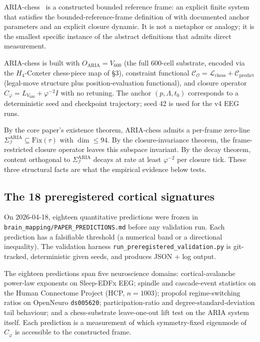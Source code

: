 \documentclass[11pt]{article}
\theoremstyle{plain}
\theoremstyle{definition}
\theoremstyle{remark}
\newcommand{\Fix}{\mathrm{Fix}}
\newcommand{\Ical}{\mathcal{I}}
\newcommand{\Ocal}{\mathcal{O}}
\newcommand{\Ccal}{\mathcal{C}}
\newcommand{\Cph}{C_\varphi}
\begin{document}
ARIA-chess~\citep{SmartAriaChess2026} is a constructed bounded reference frame: an explicit finite system that satisfies the bounded-reference-frame definition of \citet{SmartExistenceClosure} with documented anchor parameters and an explicit closure dynamic. It is not a metaphor or analogy; it is the smallest specific instance of the abstract definitions that admits direct measurement.

ARIA-chess is built with $O_{\mathrm{ARIA}} = V_{600}$ (the full 600-cell substrate, encoded via the $H_4$-Coxeter chess-piece map of \citet{SmartAriaChess2026} \S 3), constraint functional $\Ccal_\Ocal = \mathcal{L}_{\mathrm{chess}} + \Ccal_{\mathrm{predict}}$ (legal-move structure plus position-evaluation functional), and closure operator $\Cph = L_{V_{600}} + \varphi^{-2} I$ with no retuning. The anchor $(p, \Lambda, t_0)$ corresponds to a deterministic seed and checkpoint trajectory; seed 42 is used for the v4 EEG runs.

By the core paper's existence theorem, ARIA-chess admits a per-frame zero-line $\Sigma_\Ical^{\mathrm{ARIA}} \subseteq \Fix(\tau)$ with $\dim \leq 94$. By the closure-invariance theorem, the frame-restricted closure operator leaves this subspace invariant. By the decay theorem, content orthogonal to $\Sigma_\Ical^{\mathrm{ARIA}}$ decays at rate at least $\varphi^{-2}$ per closure tick. These three structural facts are what the empirical evidence below tests.

\subsection{The 18 preregistered cortical signatures}\label{sec:aria-prereg}

On 2026-04-18, eighteen quantitative predictions were frozen in \citet{SmartAriaChess2026} \texttt{brain\_mapping/PAPER\_PREDICTIONS.md} before any validation run. Each prediction has a falsifiable threshold (a numerical band or a directional inequality). The validation harness \texttt{run\_preregistered\_validation.py} is git-tracked, deterministic given seeds, and produces JSON + log output.

The eighteen predictions span five neuroscience domains: cortical-avalanche power-law exponents on Sleep-EDFx EEG; spindle and cascade-event statistics on the Human Connectome Project (HCP, $n = 1003$); propofol regime-switching ratios on OpenNeuro \texttt{ds005620}; participation-ratio and degree-standard-deviation tail behaviour; and a chess-substrate leave-one-out lift test on the ARIA system itself. Each prediction is a measurement of which symmetry-fixed eigenmode of $\Cph$ is accessible to the constructed frame.
\end{document}
